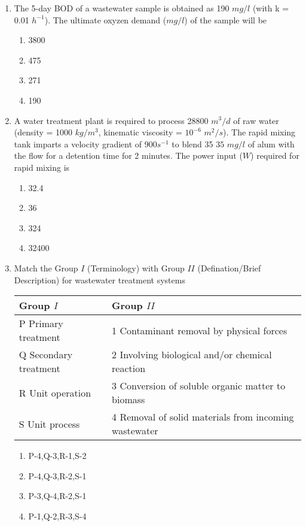 \documentclass[journal]{IEEEtran}
\begin{document}
\begin{enumerate}
\begin{multicols}{2}
\begin{enumerate}
	\end{enumerate}
\end{multicols}
	\item The 5-day BOD of a wastewater sample is obtained as 190 $mg/l$ (with k = 0.01 $h^{-1}$). The ultimate oxyzen demand ($mg/l$) of the sample will be
	\begin{multicols}{2}
	\begin{enumerate}
		\item 3800
		\item 475
		\item 271
		\item 190
	\end{enumerate}
\end{multicols}
\item A water treatment plant is required to process 28800 $m^3/d$ of raw water (density = 1000 $kg/m^3$, kinematic viscosity = $10^{-6}$ $m^2/s$). The rapid mixing tank imparts a velocity gradient of $900 s^{-1}$ to blend 35 $35$ $mg/l$ of alum with the flow for a detention time for 2 minutes. The power input ($W$) required for rapid mixing is
\begin{multicols}{2}
	\begin{enumerate}
		\item 32.4
		\item 36
		\item 324
		\item 32400
	\end{enumerate}
\end{multicols}
	\item Match the Group $I$ (Terminology) with Group $II$ (Defination/Brief Description) for wastewater treatment systems \\
\begin{center}

\begin{tabular}{|l|l|}
	\hline 
	Group $I$ & Group $II$\\
	\hline
	P Primary treatment   & 1 Contaminant removal by physical forces \\
	\hline
	Q Secondary treatment & 2 Involving biological and/or chemical reaction\\
	\hline
	R Unit operation & 3 Conversion of soluble organic matter to biomass \\
	\hline
	S Unit process & 4 Removal of solid materials from incoming wastewater\\
	\hline

\end{tabular}
\end{center}
\begin{multicols}{2}
	\begin{enumerate}
		\item P-4,Q-3,R-1,S-2
		\item P-4,Q-3,R-2,S-1
		\item P-3,Q-4,R-2,S-1
		\item P-1,Q-2,R-3,S-4
	\end{enumerate}
\end{multicols}



\end{enumerate}
\end{document}

